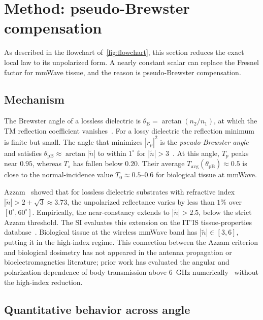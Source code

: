 \documentclass[journal,twocolumn,10pt]{IEEEtran}
\newcommand{\Tavg}{T_{\mathrm{avg}}}
\newcommand{\ntilde}{\tilde{n}}
\begin{document}
\section{Method: pseudo-Brewster compensation}\label{sec:pB}

As described in the flowchart of~\cref{fig:flowchart}, this section reduces
the exact local law to its unpolarized form. A nearly constant scalar
can replace the Fresnel factor for mmWave tissue, and the reason is
pseudo-Brewster compensation.

\subsection{Mechanism}\label{subsec:pB-mech}

The Brewster angle of a lossless dielectric is $\theta_{\mathrm{B}} =
\arctan(n_2/n_1)$, at which the TM reflection coefficient
vanishes~\cite{BornWolf1999}. For a lossy dielectric the reflection
minimum is finite but small. The angle that minimizes $|r_p|^2$ is
the \textit{pseudo-Brewster angle} and satisfies
$\theta_{\mathrm{pB}} \approx \arctan|\ntilde|$ to within $1^\circ$ for
$|\ntilde| > 3$~\cite{Potter1970,Ohman1977}. At this angle, $T_p$
peaks near $0.95$, whereas $T_s$ has fallen below $0.20$. Their
average $\Tavg(\theta_{\mathrm{pB}}) \approx 0.5$ is close to the
normal-incidence value $T_0 \approx 0.5$--$0.6$ for biological
tissue at mmWave.

Azzam~\cite{Azzam2015} showed that for lossless dielectric substrates
with refractive index $|\ntilde| > 2 + \sqrt{3} \approx 3.73$, the
unpolarized reflectance varies by less than $1\%$ over $[0^\circ,
60^\circ]$. Empirically, the near-constancy extends to $|\ntilde| > 2.5$,
below the strict Azzam threshold. The SI evaluates this extension on
the IT'IS tissue-properties database~\cite{ITISv5,Gabriel1996}. Biological tissue at the wireless mmWave
band has $|\ntilde| \in [3, 6]$, putting it in the high-index
regime. This connection between the Azzam criterion and biological dosimetry
has not appeared in the antenna propagation or bioelectromagnetics literature;
prior work has evaluated the angular and polarization
dependence of body transmission above $6$~GHz
numerically~\cite{Samaras2019} without the high-index reduction.

\subsection{Quantitative behavior across angle}\label{subsec:pB-quant}
\end{document}
